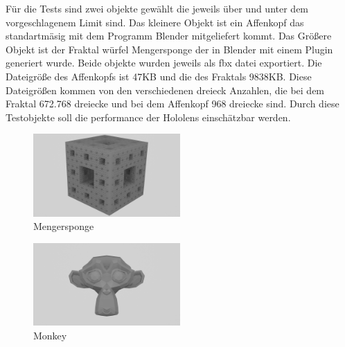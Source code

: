Für die Tests sind zwei objekte gewählt die jeweils über und unter dem vorgeschlagenem Limit \autocite{optimize_3d} sind.
Das kleinere Objekt ist ein Affenkopf \autocite{Blender_primitives} das standartmäsig mit dem Programm Blender \autocite{Blender} mitgeliefert kommt.
Das Größere Objekt ist der Fraktal würfel Mengersponge der in Blender \autocite{Blender} mit einem Plugin \autocite{Blender_Extra_Objects} generiert wurde.
Beide objekte wurden jeweils als fbx datei exportiert.
Die Dateigröße des Affenkopfs ist 47KB und die des Fraktals 9838KB.
Diese Dateigrößen kommen von den verschiedenen dreieck Anzahlen, die bei dem Fraktal 672.768 dreiecke und bei dem Affenkopf 968 dreiecke sind.
Durch diese Testobjekte soll die performance der Hololens einschätzbar werden.
\begin{figure}[ht!]
    \center
    \includegraphics[trim={13cm 0 13cm 0},clip,width={0.5\textwidth}]{../assets/img/menger_sponge.png}
    \caption{Mengersponge \autocite{Blender_Extra_Objects}}
    \label{fig:Mengersponge}
\end{figure}
\begin{figure}[ht!]
    \center
    \includegraphics[trim={14cm 3cm 14cm 4cm},clip,width={0.5\textwidth}]{../assets/img/monkey.png}
    \caption{Monkey \autocite{Blender_primitives}}
    \label{fig:Menonkey}
\end{figure}



